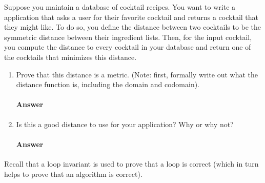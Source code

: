 \documentclass{article}
\begin{document}
\collab{\todo{}} 

Suppose you maintain a database of cocktail recipes.  You want to write a
application that asks a user for their favorite cocktail and returns a cocktail
that they might like.  To do so, you define the distance between two cocktails
to be the symmetric distance between their ingredient lists.  Then, for the
input cocktail, you compute the distance to every cocktail in your database and
return one of the cocktails that minimizes this distance.

\begin{enumerate}

    \item Prove that this distance is a metric. (Note: first, formally write out
        what the distance function is, including the domain and codomain).

        \paragraph{Answer}


    \item Is this a good distance to use for your application?  Why or why not?

        \paragraph{Answer}


\end{enumerate}


\collab{\todo{}} 

Recall that a loop invariant is used to prove that a loop is correct (which in
turn helps to prove that an algorithm is correct).
\end{document}
